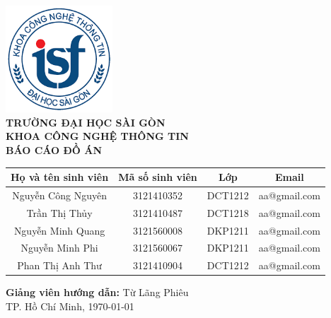 \documentclass[a4paper,12pt]{report}
\begin{document}
\begin{titlepage}
    \centering
    \includegraphics[width=4cm]{imgs/logoITSGU.png} \\[1cm]
    \textbf{\Large TRƯỜNG ĐẠI HỌC SÀI GÒN} \\[0.5cm]
    \textbf{\Large KHOA CÔNG NGHỆ THÔNG TIN} \\[2cm]
    {\Huge \textbf{BÁO CÁO ĐỒ ÁN}} \\[2cm]

    \begin{center}
        \begin{tabular}{|c|c|c|c|}
            \hline
            \textbf{Họ và tên sinh viên} & \textbf{Mã số sinh viên} & \textbf{Lớp} & \textbf{Email} \\
            \hline
            Nguyễn Công Nguyên & 3121410352 & DCT1212 & aa@gmail.com \\
            \hline
            Trần Thị Thủy & 3121410487 & DCT1218 & aa@gmail.com \\
            \hline
            Nguyễn Minh Quang & 3121560008 & DKP1211 & aa@gmail.com \\
            \hline
            Nguyễn Minh Phi & 3121560067 & DKP1211 & aa@gmail.com \\
            \hline
            Phan Thị Anh Thư & 3121410904 & DCT1212 & aa@gmail.com \\
            \hline
        \end{tabular}
    \end{center}
    
    \vspace{1cm}
    \textbf{Giảng viên hướng dẫn:} Từ Lãng Phiêu \\

    \vfill
    TP. Hồ Chí Minh, \today
\end{titlepage}

\newpage
\tableofcontents
\newpage








\end{document}
